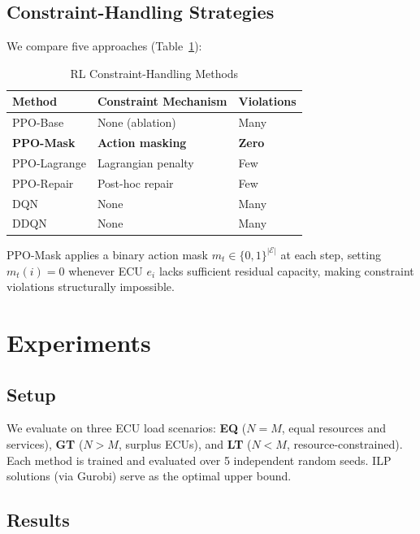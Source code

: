 \documentclass[conference]{IEEEtran}
\begin{document}
\subsection{Constraint-Handling Strategies}
We compare five approaches (Table~\ref{tab:methods}):

\begin{table}[h]
\centering
\caption{RL Constraint-Handling Methods}
\label{tab:methods}
\begin{tabular}{@{}lll@{}}
\toprule
Method & Constraint Mechanism & Violations \\
\midrule
PPO-Base     & None (ablation)        & Many \\
\textbf{PPO-Mask}     & \textbf{Action masking}         & \textbf{Zero} \\
PPO-Lagrange & Lagrangian penalty     & Few  \\
PPO-Repair   & Post-hoc repair        & Few  \\
DQN          & None                   & Many \\
DDQN         & None                   & Many \\
\bottomrule
\end{tabular}
\end{table}

PPO-Mask applies a binary action mask
$m_t \in \{0,1\}^{|\mathcal{E}|}$ at each step, setting
$m_t(i) = 0$ whenever ECU $e_i$ lacks sufficient residual capacity,
making constraint violations structurally impossible.

\section{Experiments}

\subsection{Setup}
We evaluate on three ECU load scenarios:
\textbf{EQ} ($N = M$, equal resources and services),
\textbf{GT} ($N > M$, surplus ECUs), and
\textbf{LT} ($N < M$, resource-constrained).
Each method is trained and evaluated over 5 independent random seeds.
ILP solutions (via Gurobi) serve as the optimal upper bound.

\subsection{Results}
\end{document}
